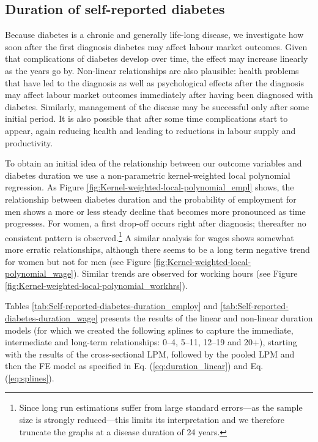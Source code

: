 \subsection{\label{sec:duration}Duration of self-reported  diabetes }

Because diabetes is a chronic and generally life-long disease, we investigate how soon after the first diagnosis diabetes may affect labour market outcomes. Given that complications of diabetes develop over time, the effect may increase linearly as the years go by. Non-linear relationships are also plausible: health problems that have led to the diagnosis as well as psychological effects after the diagnosis may affect labour market outcomes immediately after having been diagnosed with diabetes. Similarly, management of the disease may be successful only after some initial period. It is also possible that after some time complications start to appear, again reducing health and leading to reductions in labour supply and productivity.


To obtain an initial idea of the relationship between our outcome variables and diabetes duration we use a non-parametric kernel-weighted local polynomial regression. As Figure \ref{fig:Kernel-weighted-local-polynomial_empl} shows, the relationship between diabetes duration and the probability of employment for men shows a more or less steady decline that becomes more pronounced as time progresses. For women,
a first drop-off occurs right after diagnosis; thereafter no consistent pattern is observed.\footnote{Since long run estimations suffer from large standard errors---as the sample size is strongly reduced---this limits its interpretation and we therefore truncate the graphs at a disease duration of 24 years.} A similar analysis for wages shows somewhat more erratic relationships, although there seems to be a long term negative trend for women but not for men (see Figure \ref{fig:Kernel-weighted-local-polynomial_wage}).  Similar trends are observed for working hours (see Figure \ref{fig:Kernel-weighted-local-polynomial_workhrs}).

Tables \ref{tab:Self-reported-diabetes-duration_employ} and  \ref{tab:Self-reported-diabetes-duration_wage} presents the results of the linear and non-linear duration models (for which we created the following splines to capture the immediate, intermediate and long-term relationships: 0--4,
5--11, 12--19 and 20+), starting with the results of the cross-sectional \ac{LPM}, followed by the pooled \ac{LPM} and then the \ac{FE} model as specified in Eq. (\ref{eq:duration_linear}) and Eq. (\ref{eq:splines}).

